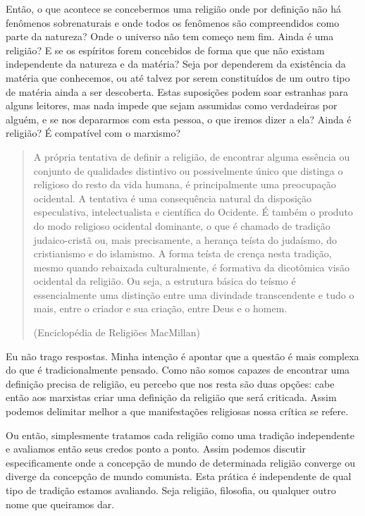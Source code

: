 Então, o que acontece se concebermos uma religião onde por definição não há fenômenos sobrenaturais e onde todos os fenômenos são compreendidos como parte da natureza? Onde o universo não tem começo nem fim. Ainda é uma religião? E se os espíritos forem concebidos de forma que que não existam independente da natureza e da matéria? Seja por dependerem da existência da matéria que conhecemos, ou até talvez por serem constituídos de um outro tipo de matéria ainda a ser descoberta. Estas suposições podem soar estranhas para alguns leitores, mas nada impede que sejam assumidas como verdadeiras por alguém, e se nos depararmos com esta pessoa, o que iremos dizer a ela?  Ainda é religião? É compatível com o marxismo?

\begin{quote}
A própria tentativa de definir a religião, de encontrar alguma essência ou conjunto de qualidades distintivo ou possivelmente único que distinga o religioso do resto da vida humana, é principalmente uma preocupação ocidental. A tentativa é uma consequência natural da disposição especulativa, intelectualista e científica do Ocidente. É também o produto do modo religioso ocidental dominante, o que é chamado de tradição judaico-cristã ou, mais precisamente, a herança teísta do judaísmo, do cristianismo e do islamismo. A forma teísta de crença nesta tradição, mesmo quando rebaixada culturalmente, é formativa da dicotômica visão ocidental da religião. Ou seja, a estrutura básica do teísmo é essencialmente uma distinção entre uma divindade transcendente e tudo o mais, entre o criador e sua criação, entre Deus e o homem.

(Enciclopédia de Religiões MacMillan)
\end{quote}

Eu não trago respostas. Minha intenção é apontar que a questão é mais complexa do que é tradicionalmente pensado. Como não somos capazes de encontrar uma definição precisa de religião, eu percebo que nos resta são duas opções: cabe então aos marxistas criar uma definição da religião que será criticada. Assim podemos delimitar melhor a que manifestações religiosas nossa crítica se refere. 

Ou então, simplesmente tratamos cada religião como uma tradição independente e avaliamos então seus credos ponto a ponto. Assim podemos discutir especificamente onde a concepção de mundo de determinada religião converge ou diverge da concepção de mundo comunista. Esta prática é independente de qual tipo de tradição estamos avaliando. Seja religião, filosofia, ou qualquer outro nome que queiramos dar.


